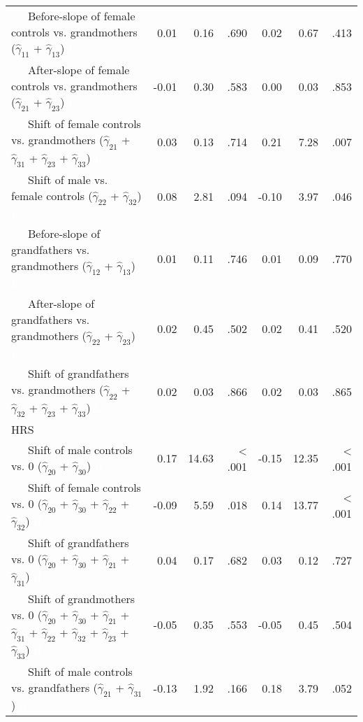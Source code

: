 \documentclass[
  english,
  man, noextraspace,floatsintext]{apa7}
\newenvironment{lltable}{\begin{landscape}\begin{center}\begin{ThreePartTable}}{\end{ThreePartTable}\end{center}\end{landscape}}
\begin{document}
\begin{appendix}
\begin{lltable}
{\begin{longtable}{lrrrrrr}
\ \ \ Before-slope of female controls vs. grandmothers 
($\hat{\gamma}_{11}$ + $\hat{\gamma}_{13}$) \textcolor{white}{L} & 0.01 & 0.16 & .690 & 0.02 & 0.67 & .413\\
\ \ \ After-slope of female controls vs. grandmothers 
($\hat{\gamma}_{21}$ + $\hat{\gamma}_{23}$) \textcolor{white}{L} & -0.01 & 0.30 & .583 & 0.00 & 0.03 & .853\\
\ \ \ Shift of female controls vs. grandmothers 
($\hat{\gamma}_{21}$ + $\hat{\gamma}_{31}$ + 
$\hat{\gamma}_{23}$ + $\hat{\gamma}_{33}$) \textcolor{white}{L} & 0.03 & 0.13 & .714 & 0.21 & 7.28 & .007\\
\ \ \ Shift of male vs. female controls 
($\hat{\gamma}_{22}$ + $\hat{\gamma}_{32}$) \textcolor{white}{L} & 0.08 & 2.81 & .094 & -0.10 & 3.97 & .046\\
\ \ \ Before-slope of grandfathers vs. grandmothers 
($\hat{\gamma}_{12}$ + $\hat{\gamma}_{13}$) \textcolor{white}{L} & 0.01 & 0.11 & .746 & 0.01 & 0.09 & .770\\
\ \ \ After-slope of grandfathers vs. grandmothers 
($\hat{\gamma}_{22}$ + $\hat{\gamma}_{23}$) \textcolor{white}{L} & 0.02 & 0.45 & .502 & 0.02 & 0.41 & .520\\
\ \ \ Shift of grandfathers vs. grandmothers 
($\hat{\gamma}_{22}$ + $\hat{\gamma}_{32}$ + 
$\hat{\gamma}_{23}$ + $\hat{\gamma}_{33}$) \textcolor{white}{L} & 0.02 & 0.03 & .866 & 0.02 & 0.03 & .865\\
HRS &  &  &  &  &  & \\
\ \ \ Shift of male controls vs. 0 ($\hat{\gamma}_{20}$ + 
$\hat{\gamma}_{30}$) \textcolor{white}{H} & 0.17 & 14.63 & < .001 & -0.15 & 12.35 & < .001\\
\ \ \ Shift of female controls vs. 0 ($\hat{\gamma}_{20}$ + 
$\hat{\gamma}_{30}$ + $\hat{\gamma}_{22}$ + 
$\hat{\gamma}_{32}$) \textcolor{white}{H} & -0.09 & 5.59 & .018 & 0.14 & 13.77 & < .001\\
\ \ \ Shift of grandfathers vs. 0 ($\hat{\gamma}_{20}$ + 
$\hat{\gamma}_{30}$ + $\hat{\gamma}_{21}$ + 
$\hat{\gamma}_{31}$) \textcolor{white}{H} & 0.04 & 0.17 & .682 & 0.03 & 0.12 & .727\\
\ \ \ Shift of grandmothers vs. 0 ($\hat{\gamma}_{20}$ + 
$\hat{\gamma}_{30}$ + $\hat{\gamma}_{21}$ + 
$\hat{\gamma}_{31}$ + $\hat{\gamma}_{22}$ + 
$\hat{\gamma}_{32}$ + $\hat{\gamma}_{23}$ +
$\hat{\gamma}_{33}$) \textcolor{white}{H} & -0.05 & 0.35 & .553 & -0.05 & 0.45 & .504\\
\ \ \ Shift of male controls vs. grandfathers 
($\hat{\gamma}_{21}$ + $\hat{\gamma}_{31}$) \textcolor{white}{H} & -0.13 & 1.92 & .166 & 0.18 & 3.79 & .052\\

\end{longtable}}
\end{lltable}
\end{appendix}
\end{document}
